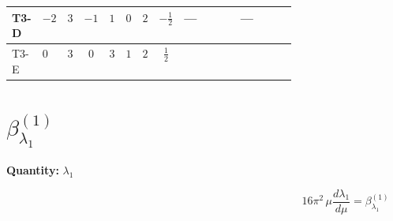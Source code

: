 \documentclass[8pt]{article}
\begin{document}
\begin{landscape}
\begin{longtable}{@{}llcccccc >{\raggedright\arraybackslash}p{0.21\linewidth} >{\raggedright\arraybackslash}p{0.21\linewidth}@{}}
\midrule
T3-D & $-2$ & $3$ & $-1$ & $1$ & $0$ & $2$ & $-\frac{1}{2}$ & --- & --- \\
\midrule
T3-E & $0$ & $3$ & $0$ & $3$ & $1$ & $2$ & $\frac{1}{2}$ & \scriptsize\adjustbox{max width=\linewidth}{$\begin{gathered} +{m_2^2} (8 {\lambda_{S_2}^{(1)}}+4 {\lambda_{S_2}^{(A)}})\end{gathered}$} & \scriptsize\adjustbox{max width=\linewidth}{$\begin{gathered} +{m_1^2} (6 {\lambda_{12}^{(1)}}+4 {\lambda_{12}^{(\times)}})\end{gathered}$} \\
\midrule
\bottomrule
\end{longtable}
\clearpage
\section*{$\beta_{\lambda_1}^{(1)}$}
\noindent\textbf{Quantity: }$\lambda_1$\par\smallskip
\[16\pi^2\,\mu\frac{d \lambda_1}{d\mu}=\beta_{\lambda_1}^{(1)}\]

\end{landscape}
\end{document}
